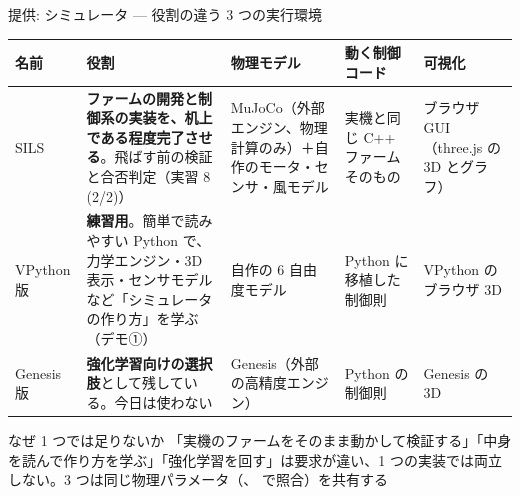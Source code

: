 \begin{frame}{提供: シミュレータ --- 役割の違う 3 つの実行環境}
  \begin{table}
    \centering\scriptsize
    \renewcommand{\arraystretch}{1.2}
    \setlength{\tabcolsep}{4pt}
    \begin{tabular}{p{15mm}p{40mm}p{28mm}p{24mm}p{22mm}}
      \hline
      \textbf{名前} & \textbf{役割} & \textbf{物理モデル} & \textbf{動く制御コード} & \textbf{可視化} \\
      \hline
      SILS & \textbf{ファームの開発と制御系の実装を、机上である程度完了させる}。飛ばす前の検証と合否判定（実習 8 (2/2)） & MuJoCo（外部エンジン、物理計算のみ）＋自作のモータ・センサ・風モデル & 実機と同じ C++ ファームそのもの & ブラウザ GUI（three.js の 3D とグラフ） \\
      VPython 版 & \textbf{練習用}。簡単で読みやすい Python で、力学エンジン・3D 表示・センサモデルなど「シミュレータの作り方」を学ぶ（デモ①） & 自作の 6 自由度モデル & Python に移植した制御則 & VPython のブラウザ 3D \\
      Genesis 版 & \textbf{強化学習向けの選択肢}として残している。今日は使わない & Genesis（外部の高精度エンジン） & Python の制御則 & Genesis の 3D \\
      \hline
    \end{tabular}
  \end{table}

  \begin{block}{なぜ 1 つでは足りないか}
    \footnotesize 「実機のファームをそのまま動かして検証する」「中身を読んで作り方を学ぶ」「強化学習を回す」は要求が違い、1 つの実装では両立しない。3 つは同じ物理パラメータ（、 で照合）を共有する
  \end{block}
\end{frame}

